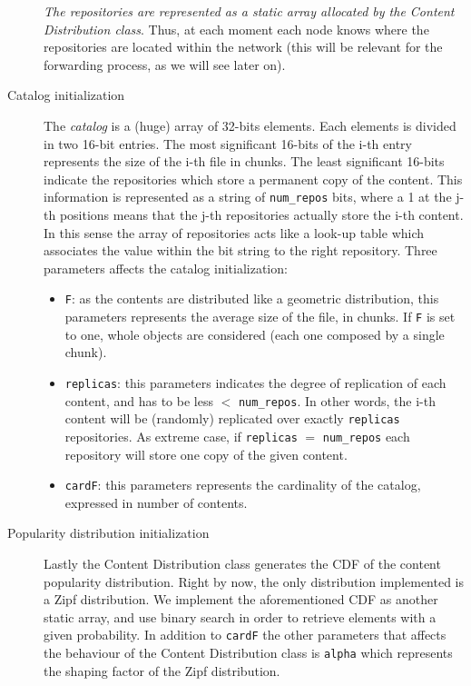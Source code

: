 \documentclass{article}
\begin{document}
\begin{description}
\begin{itemize}
	\end{itemize}
	\emph{The repositories are represented as a static array allocated by the Content Distribution class}. Thus, at each moment each node knows where the repositories are located within the network (this will be relevant for the forwarding process, as we will see later on).
    \item[Catalog initialization] The \emph{catalog} is a (huge) array of 32-bits elements. Each elements is divided in two 16-bit entries. The most significant 16-bits of the i-th entry represents the size of the i-th file in chunks. The least significant 16-bits indicate the repositories which store a permanent copy of the content. This information is represented as  a string of \verb|num_repos| bits, where a 1 at the j-th positions means that the j-th repositories actually store the i-th content. In this sense the array of repositories acts like a look-up table which associates the value within the bit string to the right repository. Three parameters affects the catalog initialization:
	\begin{itemize}
	    \item \verb|F|: as the contents are distributed like a geometric distribution, this parameters represents the average size of the file, in chunks. If \verb|F| is set to one, whole objects are considered (each one composed by a single chunk).
	    \item \verb|replicas|: this parameters indicates the degree of replication of each content, and has to be less $<$ \verb|num_repos|. In other words, the i-th content will be (randomly) replicated over exactly \verb|replicas| repositories. As extreme case, if \verb|replicas| $=$ \verb|num_repos| each repository will store one copy of the given content. 
	    \item \verb|cardF|: this parameters represents the cardinality of the catalog, expressed in number of contents. 
	\end{itemize}
    \item[Popularity distribution initialization] Lastly the Content Distribution class generates the CDF of the content popularity distribution. Right by now, the only distribution implemented is a Zipf distribution. We implement the aforementioned CDF as another static array, and use binary search in order to retrieve elements with a given probability. In addition to \verb|cardF| the other parameters that affects the behaviour of the Content Distribution class is \verb|alpha| which represents the shaping factor of the Zipf distribution. 
\end{description}
\end{document}
